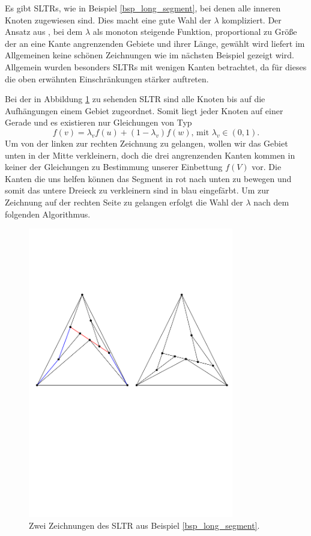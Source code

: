 Es gibt SLTRs, wie in Beispiel \ref{bsp_long_segment}, bei denen alle inneren Knoten zugewiesen sind. Dies macht eine gute Wahl der $\lambda$ kompliziert. Der Ansatz aus \cite{fs17}, bei dem $\lambda$ als monoton steigende Funktion, proportional zu Größe der an eine Kante angrenzenden Gebiete und ihrer Länge, gewählt wird liefert im Allgemeinen keine schönen Zeichnungen wie im nächsten Beispiel gezeigt wird. Allgemein wurden besonders SLTRs mit wenigen Kanten betrachtet, da für dieses die oben erwähnten Einschränkungen stärker auftreten.

\begin{example}\label{bsp_long_segment}
Bei der in Abbildung \ref{long_segment} zu sehenden SLTR sind alle Knoten bis auf die Aufhängungen einem Gebiet zugeordnet. Somit liegt jeder Knoten auf einer Gerade und es existieren nur Gleichungen von Typ
$$ f(v) = \lambda_v f(u) + (1-\lambda_v)f(w) \text{, mit } \lambda_v \in (0,1).$$
Um von der linken zur rechten Zeichnung zu gelangen, wollen wir das Gebiet unten in der Mitte verkleinern, doch die drei angrenzenden Kanten kommen in keiner der Gleichungen zu Bestimmung unserer Einbettung $f(V)$ vor. Die Kanten die uns helfen können das Segment in rot nach unten zu bewegen und somit das untere Dreieck zu verkleinern sind in blau eingefärbt. Um zur Zeichnung auf der rechten Seite zu gelangen erfolgt die Wahl der $\lambda$ nach dem folgenden Algorithmus.

%

\end{example}

\begin{figure}[h]
	\centering
  \includegraphics[width=0.8\textwidth]{example1_vis.pdf}
  \caption{Zwei Zeichnungen des SLTR aus Beispiel \ref{bsp_long_segment}.}
  \label{long_segment}
\end{figure}


